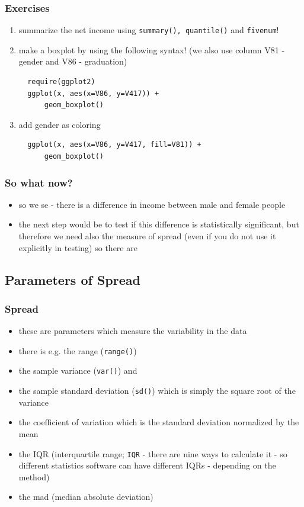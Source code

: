 \documentclass[xcolor={table}]{beamer}
\begin{document}
\begin{frame}[fragile]\frametitle{Exercises} 
  \begin{enumerate}
  \item summarize the net income using \texttt{summary(), quantile()} and \texttt{fivenum}!
  \item make a boxplot by using the following syntax! (we also use column V81 - gender and V86 - graduation)
\begin{verbatim}
  require(ggplot2)
  ggplot(x, aes(x=V86, y=V417)) +
      geom_boxplot()  
\end{verbatim}
\item add gender as coloring
\begin{verbatim}
  ggplot(x, aes(x=V86, y=V417, fill=V81)) +
      geom_boxplot()
\end{verbatim}
  \end{enumerate}
\end{frame}


\begin{frame}\frametitle{So what now?}
  \begin{itemize}
  \item so we se - there is a difference in income between male and female people
  \item the next step would be to test if this difference is statistically significant, but therefore we need also the measure of spread (even if you do not use it explicitly in testing) so there are
  \end{itemize}
\end{frame}

\subsection{Parameters of Spread}
\begin{frame}[allowframebreaks]\frametitle{Spread}
  \begin{itemize}
  \item these are parameters which measure the variability in the data
  \item there is e.g. the range (\texttt{range()})
  \item the sample variance (\texttt{var()}) and
  \item the sample standard deviation (\texttt{sd()}) which is simply the square root of the variance
  \item the coefficient of variation which is the standard deviation normalized by the mean
  \item the IQR (interquartile range; \texttt{IQR} - there are nine ways to calculate it - so different statistics software can have different IQRs - depending on the method)
  \item the mad (median absolute deviation)
  \end{itemize}
\end{frame}
\end{document}
